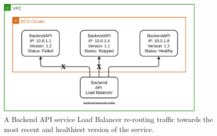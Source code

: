 \begin{figure}[!htbp]
    \centering
    \includegraphics[width=0.90\textwidth]{img/diagrams/pdf/load-balancing.drawio.pdf}
    \caption[Load Balancing Example]{A Backend API service Load Balancer re-routing traffic towards the most recent and healthiest version of the service.}
    \label{fig:load-balancing}
\end{figure}
